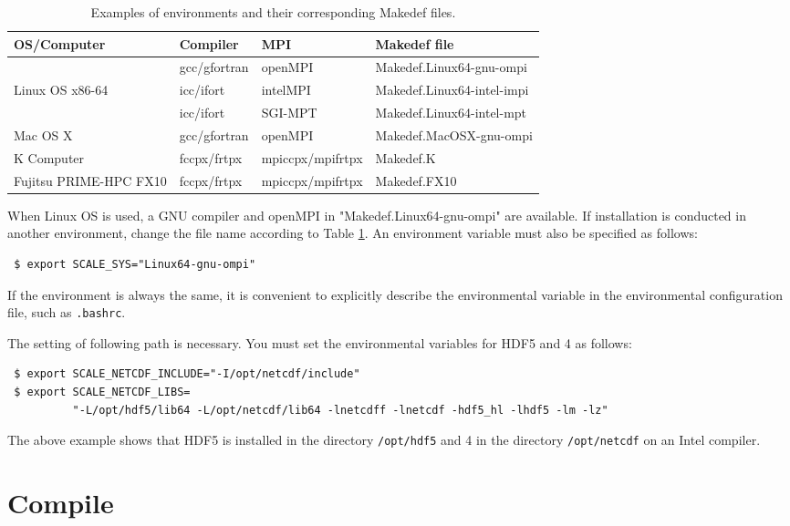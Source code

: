 \begin{table}[htb]
\begin{center}
\caption{Examples of environments and their corresponding Makedef files.}
\begin{tabularx}{150mm}{|l|l|X|l|} \hline
 \rowcolor[gray]{0.9} OS/Computer & Compiler & MPI & Makedef file \\ \hline
                 & gcc/gfortran & openMPI  & Makedef.Linux64-gnu-ompi \\ \cline{2-4}
 Linux OS x86-64 & icc/ifort    & intelMPI & Makedef.Linux64-intel-impi \\ \cline{2-4}
                 & icc/ifort    & SGI-MPT  & Makedef.Linux64-intel-mpt \\ \hline
 Mac OS X        & gcc/gfortran & openMPI  & Makedef.MacOSX-gnu-ompi \\ \hline
 K Computer      & fccpx/frtpx  & mpiccpx/mpifrtpx & Makedef.K \\ \hline
 Fujitsu PRIME-HPC FX10 & fccpx/frtpx & mpiccpx/mpifrtpx & Makedef.FX10 \\ \hline
\end{tabularx}
\label{tab:makedef}
\end{center}
\end{table}

When Linux OS is used, a GNU compiler and openMPI in "Makedef.Linux64-gnu-ompi" are available. If installation is conducted in another environment, change the file name according to Table \ref{tab:makedef}. An environment variable must also be specified as follows:
\begin{verbatim}
 $ export SCALE_SYS="Linux64-gnu-ompi"
\end{verbatim}
If the environment is always the same, it is convenient to explicitly describe the environmental variable in the environmental configuration file, such as \verb|.bashrc|.

The setting of following path is necessary. You must set the environmental variables for HDF5 and {\netcdf}4 as follows:
\begin{verbatim}
 $ export SCALE_NETCDF_INCLUDE="-I/opt/netcdf/include"
 $ export SCALE_NETCDF_LIBS=
          "-L/opt/hdf5/lib64 -L/opt/netcdf/lib64 -lnetcdff -lnetcdf -hdf5_hl -lhdf5 -lm -lz"
\end{verbatim}
The above example shows that
HDF5 is installed in the directory \verb|/opt/hdf5|
and {\netcdf}4 in the directory \verb|/opt/netcdf|
on an Intel compiler.

\section{Compile} %

